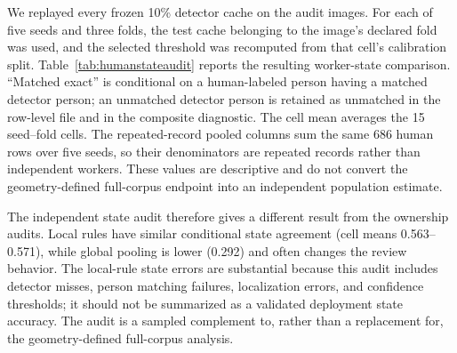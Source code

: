 \documentclass[iicol,pdflatex,sn-mathphys-num]{sn-jnl}
\begin{document}
We replayed every frozen 10\% detector cache on the audit images. For each of five seeds and three folds, the test cache belonging to the image's declared fold was used, and the selected threshold was recomputed from that cell's calibration split. Table~\ref{tab:humanstateaudit} reports the resulting worker-state comparison. ``Matched exact'' is conditional on a human-labeled person having a matched detector person; an unmatched detector person is retained as unmatched in the row-level file and in the composite diagnostic. The cell mean averages the 15 seed--fold cells. The repeated-record pooled columns sum the same 686 human rows over five seeds, so their denominators are repeated records rather than independent workers. These values are descriptive and do not convert the geometry-defined full-corpus endpoint into an independent population estimate.

\begin{table}[t]
\caption{Independent sampled human worker-state audit on 220 pre-frozen images and 686 human-labeled worker rows. The detector cache and selected policy are evaluated separately for each of 15 seed--fold cells. Matched exact and decision rate are means over cells. The repeated-record pooled rates use the same sampled rows repeated over five seeds; they are not independent-worker estimates. Auto-safe and composite errors use the 1,710 repeated human-unsafe rows as denominator.}
\label{tab:humanstateaudit}
\centering
\scriptsize
\setlength{\tabcolsep}{3pt}
\end{table}

The independent state audit therefore gives a different result from the ownership audits. Local rules have similar conditional state agreement (cell means 0.563--0.571), while global pooling is lower (0.292) and often changes the review behavior. The local-rule state errors are substantial because this audit includes detector misses, person matching failures, localization errors, and confidence thresholds; it should not be summarized as a validated deployment state accuracy. The audit is a sampled complement to, rather than a replacement for, the geometry-defined full-corpus analysis.
\end{document}
